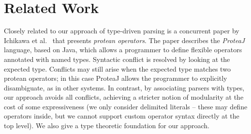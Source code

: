 \section{Related Work}
\label{s:related}

Closely related to our approach of type-driven parsing is a concurrent paper by Ichikawa et al.~\cite{Ichikawa:2014:CUO:2584469.2577092} that presents \textit{protean operators}. The paper describes the \textit{ProteaJ} language, based on Java, which allows a programmer to define flexible
operators annotated with named types. Syntactic conflict is resolved by looking at the expected type. Conflicts may still arise when the expected type matches two protean operators; in this case ProteaJ allows the programmer to explicitly disambiguate, as in other systems.  In contrast, by associating parsers with types, our approach avoids all conflicts, achieving a stricter notion of modularity at the cost of some expressiveness (we only consider delimited literals -- these may define operators inside, but we cannot support custom  operator syntax directly at the top level). We also give a type theoretic foundation for our approach.




